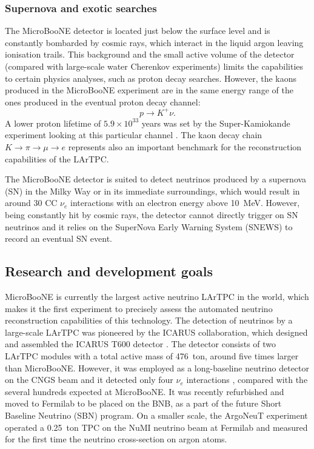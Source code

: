 \subsubsection{Supernova and exotic searches}
The MicroBooNE detector is located just below the surface level and is constantly bombarded by cosmic rays, which interact in the liquid argon leaving ionisation trails. This background and the small active volume of the detector (compared with large-scale water Cherenkov experiments) limits the capabilities to certain physics analyses, such as proton decay searches. However, the kaons produced in the MicroBooNE experiment are in the same energy range of the ones produced in the eventual proton decay channel:
\begin{equation}
    p\to K^+\nu.
\end{equation}
A lower proton lifetime of $5.9\times10^{33}$ years was set by the Super-Kamiokande experiment looking at this particular channel \cite{Abe:2014mwa}. The kaon decay chain $K\rightarrow\pi\rightarrow\mu\rightarrow e$ represents also an important benchmark for the reconstruction capabilities of the LArTPC.

The MicroBooNE detector is suited to detect neutrinos produced by a supernova (SN) in the Milky Way or in its immediate surroundings, which would result in around 30 CC $\nu_e$ interactions with an electron energy above 10~MeV. However, being constantly hit by cosmic rays, the detector cannot directly trigger on SN neutrinos and it relies on the SuperNova Early Warning System (SNEWS) to record an eventual SN event. 


\subsection{Research and development goals}
MicroBooNE is currently the largest active neutrino LArTPC in the world, which makes it the first experiment to precisely assess the automated neutrino reconstruction capabilities of this technology. The detection of neutrinos by a large-scale LArTPC was pioneered by the ICARUS collaboration, which designed and assembled the ICARUS T600 detector \cite{Amerio:2004ze}. The detector consists of two LArTPC modules with a total active mass of 476~ton, around five times larger than MicroBooNE. However, it was employed as a long-baseline neutrino detector on the CNGS beam and it detected only four $\nu_e$ interactions \cite{Antonello:2013gut}, compared with the several hundreds expected at MicroBooNE. It was recently refurbished and moved to Fermilab to be placed on the BNB, as a part of the future Short Baseline Neutrino (SBN) program. On a smaller scale, the ArgoNeuT experiment operated a 0.25~ton TPC on the NuMI neutrino beam at Fermilab \cite{Anderson:2012vc} and measured for the first time the neutrino cross-section on argon atoms.

